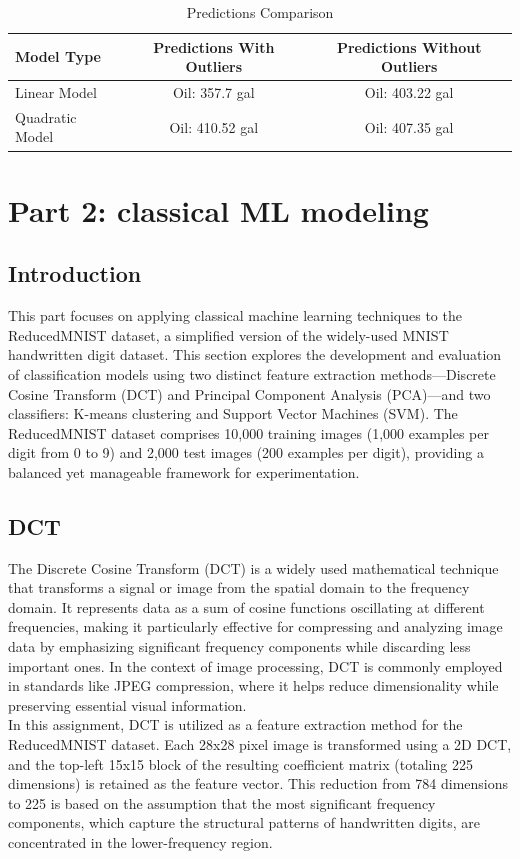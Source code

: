 \documentclass[12pt]{article}
\begin{document}
\begin{table}[h!]
    \centering
    \caption{Predictions Comparison}
    \begin{tabular}{lcc}
        \toprule
        \textbf{Model Type} & \textbf{Predictions With Outliers} & \textbf{Predictions Without Outliers} \\
        \midrule
        Linear Model & Oil: 357.7 gal & Oil: 403.22 gal \\
        Quadratic Model & Oil: 410.52 gal & Oil: 407.35 gal \\
        \bottomrule
    \end{tabular}
\end{table}


\newpage
\section{Part 2: classical ML modeling}
\subsection{Introduction}

 This part focuses on applying classical machine learning techniques to the ReducedMNIST dataset, a simplified version of the widely-used MNIST handwritten digit dataset. This section explores the development and evaluation of classification models using two distinct feature extraction methods---Discrete Cosine Transform (DCT) and Principal Component Analysis (PCA)---and two classifiers: K-means clustering and Support Vector Machines (SVM). The ReducedMNIST dataset comprises 10,000 training images (1,000 examples per digit from 0 to 9) and 2,000 test images (200 examples per digit), providing a balanced yet manageable framework for experimentation.

\subsection{DCT}
The Discrete Cosine Transform (DCT) is a widely used mathematical technique that transforms a signal or image from the spatial domain to the frequency domain. It represents data as a sum of cosine functions oscillating at different frequencies, making it particularly effective for compressing and analyzing image data by emphasizing significant frequency components while discarding less important ones. In the context of image processing, DCT is commonly employed in standards like JPEG compression, where it helps reduce dimensionality while preserving essential visual information.\\
In this assignment, DCT is utilized as a feature extraction method for the ReducedMNIST dataset. Each 28x28 pixel image is transformed using a 2D DCT, and the top-left 15x15 block of the resulting coefficient matrix (totaling 225 dimensions) is retained as the feature vector. This reduction from 784 dimensions to 225 is based on the assumption that the most significant frequency components, which capture the structural patterns of handwritten digits, are concentrated in the lower-frequency region.
\end{document}
